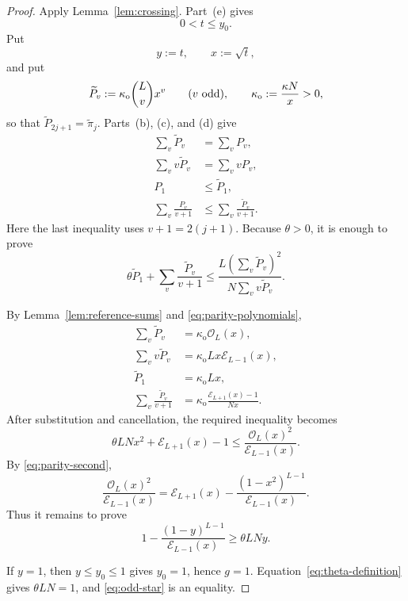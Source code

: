 \documentclass[12pt]{amsart}
\theoremstyle{plain}
\theoremstyle{definition}
\theoremstyle{remark}
\begin{document}
\begin{proof}
Apply Lemma~\ref{lem:crossing}.  Part~\textup{(e)} gives
\[
 0<t\le y_0.
\]
Put
\[
 y:=t,\qquad x:=\sqrt t,
\]
and put
\[
 \widetilde P_v:=\kappa_{\mathrm o}\binom Lv x^v
 \qquad(v\ {\rm odd}),
 \qquad
 \kappa_{\mathrm o}:=\frac{\kappa N}{x}>0,
\]
so that \(\widetilde P_{2j+1}=\widetilde\pi_j\).
Parts~\textup{(b)},
\textup{(c)}, and \textup{(d)} give
\begin{equation}\label{eq:odd-comparison-data}
\begin{aligned}
 \sum_v\widetilde P_v
 &=\sum_vP_v,\\
 \sum_vv\widetilde P_v
 &=\sum_vvP_v,\\
 P_1&\le\widetilde P_1,\\
 \sum_v\frac{P_v}{v+1}
 &\le
 \sum_v\frac{\widetilde P_v}{v+1}.
\end{aligned}
\end{equation}
Here the last inequality uses \(v+1=2(j+1)\).
Because \(\theta>0\), it is enough to prove
\[
 \theta\widetilde P_1
 +\sum_v\frac{\widetilde P_v}{v+1}
 \le
 \frac{L\left(\sum_v\widetilde P_v\right)^2}
 {N\sum_vv\widetilde P_v}.
\]

By Lemma~\ref{lem:reference-sums} and
\eqref{eq:parity-polynomials},
\[
\begin{aligned}
 \sum_v\widetilde P_v
 &=\kappa_{\mathrm o}\mathcal O_L(x),\\
 \sum_vv\widetilde P_v
 &=\kappa_{\mathrm o}Lx\mathcal E_{L-1}(x),\\
 \widetilde P_1
 &=\kappa_{\mathrm o}Lx,\\
 \sum_v\frac{\widetilde P_v}{v+1}
 &=\kappa_{\mathrm o}
 \frac{\mathcal E_{L+1}(x)-1}{Nx}.
\end{aligned}
\]
After substitution and cancellation, the required inequality becomes
\[
 \theta LNx^2+\mathcal E_{L+1}(x)-1
 \le
 \frac{\mathcal O_L(x)^2}{\mathcal E_{L-1}(x)}.
\]
By \eqref{eq:parity-second},
\[
 \frac{\mathcal O_L(x)^2}{\mathcal E_{L-1}(x)}
 =
 \mathcal E_{L+1}(x)
 -
 \frac{(1-x^2)^{L-1}}{\mathcal E_{L-1}(x)}.
\]
Thus it remains to prove
\begin{equation}\label{eq:odd-star}
 1-\frac{(1-y)^{L-1}}{\mathcal E_{L-1}(x)}
 \ge\theta LNy.
\end{equation}

If \(y=1\), then \(y\le y_0\le1\) gives \(y_0=1\), hence \(g=1\).
Equation~\eqref{eq:theta-definition} gives \(\theta LN=1\), and
\eqref{eq:odd-star} is an equality.


\end{proof}
\end{document}
